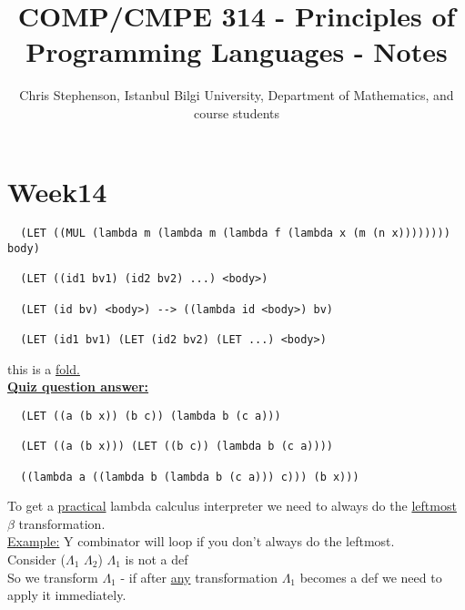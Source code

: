 \documentclass{article}
\begin{document}
\title{COMP/CMPE 314 - Principles of Programming Languages - Notes}
\author{Chris Stephenson, Istanbul Bilgi University, Department of Mathematics, and course students}
\maketitle

\section*{Week14}
\begin{flushleft}
 \begin{verbatim}
  (LET ((MUL (lambda m (lambda m (lambda f (lambda x (m (n x)))))))) body)
  
  (LET ((id1 bv1) (id2 bv2) ...) <body>)
  
  (LET (id bv) <body>) --> ((lambda id <body>) bv)
  
  (LET (id1 bv1) (LET (id2 bv2) (LET ...) <body>)
 \end{verbatim}
 this is a \underline{fold.}\\
 \bigskip
 \underline{\textbf{Quiz question answer:}}\\
 \begin{verbatim}
  (LET ((a (b x)) (b c)) (lambda b (c a)))
  
  (LET ((a (b x))) (LET ((b c)) (lambda b (c a))))
  
  ((lambda a ((lambda b (lambda b (c a))) c))) (b x)))
 \end{verbatim}
 \bigskip
 To get a \underline{practical} lambda calculus interpreter we need to always do the \underline{leftmost} $\beta$ transformation.\\
 \underline{Example:} Y combinator will loop if you don't always do the leftmost.\\
 \bigskip
 Consider ($\Lambda_1$ $\Lambda_2$) $\Lambda_1$ is not a def \\
 So we transform $\Lambda_1$ - if after \underline{any} transformation $\Lambda_1$ becomes a def we need to apply it immediately.
\end{flushleft}
\end{document}
